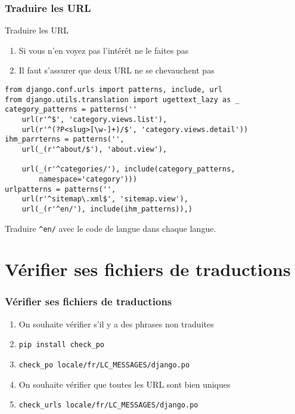 \documentclass{beamer}
\begin{document}
\begin{frame}[fragile]
  \frametitle{Traduire les URL}
  \vspace{-0.7em}
  \begin{alertblock}{Traduire les URL}
      \begin{enumerate}
         \pause \item Si vous n'en voyez pas l'intérêt ne le faites pas
         \pause \item Il faut s'assurer que deux URL ne se chevauchent pas
      \end{enumerate}
  \end{alertblock}
\pause

  \begin{lstlisting}
from django.conf.urls import patterns, include, url
from django.utils.translation import ugettext_lazy as _
category_patterns = patterns(''
    url(r'^$', 'category.views.list'),
    url(r'^(?P<slug>[\w-]+)/$', 'category.views.detail'))
ihm_parrterns = patterns('',
    url(_(r'^about/$'), 'about.view'),

    url(_(r'^categories/'), include(category_patterns,
        namespace='category')))
urlpatterns = patterns('',
    url(r'^sitemap\.xml$', 'sitemap.view'),
    url(_(r'^en/'), include(ihm_patterns)),)
  \end{lstlisting}
\pause
Traduire \texttt{\textasciicircum en/} avec le code de langue dans chaque langue.

\end{frame}

\section{Vérifier ses fichiers de traductions}
\begin{frame}
  \frametitle{Vérifier ses fichiers de traductions}

  \begin{enumerate}
    \item On souhaite vérifier s'il y a des phrases non traduites
    \pause \item \texttt{pip install check\_po}
    \pause \item \texttt{check\_po locale/fr/LC\_MESSAGES/django.po}
    \pause \item On souhaite vérifier que toutes les URL sont bien uniques
    \pause \item \texttt{check\_urls locale/fr/LC\_MESSAGES/django.po}
  \end{enumerate}
\end{frame}
\end{document}
